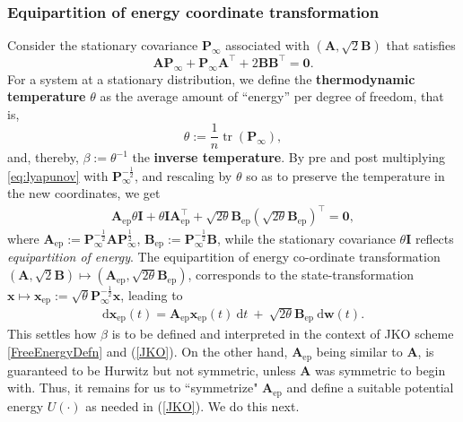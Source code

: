\documentclass[letterpaper,10pt,twocolumn,conference]{ieeeconf}
\newcommand{\bbw}{\bm{w}}
\newcommand{\bbx}{{\bm{x}}}
\newcommand{\ep}{_{\mathrm{ep}}}
\newcommand{\bbP}{\bm{P}}
\newcommand{\bbA}{\bm{A}}
\newcommand{\bbB}{\bm{B}}
\newcommand{\bbI}{\bm{I}}
\newcommand{\tr}{\operatorname{tr}}
\begin{document}
\subsubsection{Equipartition of energy coordinate transformation}\label{EquipartitionSubsubsection}
Consider the stationary covariance $\bbP_{\infty}$ associated with $(\bbA,\sqrt{2}\bbB)$ that satisfies 
\begin{equation}\label{eq:lyapunov}
\bbA\bbP_{\infty} + \bbP_{\infty}\bbA^{\top} + 2\bbB\bbB^{\top} = \bm{0}.
\end{equation}
For a system at a stationary distribution, we define the \textbf{thermodynamic temperature} $\theta$ as the average amount of ``energy'' per degree of freedom, that is,
\[
\theta := \frac{1}{n}\tr(\bbP_{\infty}),
\]
and, thereby, $\beta:=\theta^{-1}$ the \textbf{inverse temperature}. By
 pre and post multiplying \eqref{eq:lyapunov} with $\bbP_{\infty}^{-\frac{1}{2}}$, and rescaling by $\theta$ so as to preserve the temperature in the new coordinates, we get 
\begin{eqnarray}
\bbA\ep\theta\bbI + \theta\bbI\bbA\ep^{\top} + \sqrt{2\theta}\bbB\ep(\sqrt{2\theta}\bbB\ep)^{\top}=\bm{0},
\label{LyapunovInY} 
\end{eqnarray}
where $\bbA\ep := \bbP_{\infty}^{-\frac{1}{2}}\bbA\bbP_{\infty}^{\frac{1}{2}}$, $\bbB\ep := \bbP_{\infty}^{-\frac{1}{2}}\bbB$, while the stationary covariance $\theta\bbI$ reflects {\em equipartition of energy}. The equipartition of energy co-ordinate transformation $(\bbA,\sqrt{2}\bbB)\mapsto (\bbA\ep,\sqrt{2\theta}\bbB\ep)$, corresponds to the state-transformation $\bbx \mapsto \bbx\ep := \sqrt{\theta}\bbP_{\infty}^{-\frac{1}{2}} \bbx$, leading to
\begin{eqnarray}
\mathrm{d}\bbx\ep(t) = \bbA\ep\bbx\ep(t) \:\mathrm{d}t \: + \: \sqrt{2\theta}\bbB\ep\:\mathrm{d}\bbw(t).
\label{ySDE}	
\end{eqnarray}
\noindent This settles how $\beta$ is to be defined and interpreted in the context of JKO scheme  \eqref{FreeEnergyDefn} and (\ref{JKO}). On the other hand, $\bbA\ep$ being similar to $\bbA$, is guaranteed to be Hurwitz but not symmetric, unless $\bbA$ was symmetric to begin with. Thus, it remains for us to ``symmetrize" $\bbA\ep$ and define a suitable potential energy $U(\cdot)$ as needed in (\ref{JKO}). We do this next.
\end{document}
